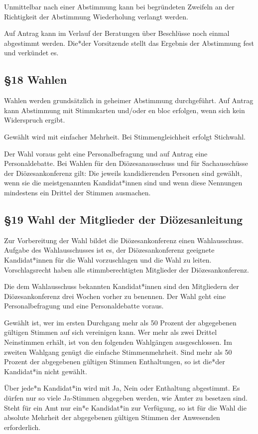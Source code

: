 \documentclass[12pt]{report}
\begin{document}
\begin{justify}
Unmittelbar nach einer Abstimmung kann bei begründeten Zweifeln an der Richtigkeit der Abstimmung 
Wiederholung verlangt werden.

Auf Antrag kann im Verlauf der Beratungen über Beschlüsse noch einmal abgestimmt werden.
Die*der Vorsitzende stellt das Ergebnis der Abstimmung fest und verkündet es.

\subsection*{§18 Wahlen}
Wahlen werden grundsätzlich in geheimer Abstimmung durchgeführt. Auf Antrag kann Abstimmung mit
Stimmkarten und/oder en bloc erfolgen, wenn sich kein Widerspruch ergibt.

Gewählt wird mit einfacher Mehrheit. Bei Stimmengleichheit erfolgt Stichwahl.

Der Wahl voraus geht eine Personalbefragung und auf Antrag eine Personaldebatte. Bei Wahlen für den 
Diözesanausschuss und für Sachausschüsse der Diözesankonferenz gilt: Die jeweils kandidierenden Personen
sind gewählt, wenn sie die meistgenannten Kandidat*innen sind und wenn diese Nennungen mindestens ein
Drittel der Stimmen ausmachen.

\subsection*{§19 Wahl der Mitglieder der Diözesanleitung}
Zur Vorbereitung der Wahl bildet die Diözesankonferenz einen Wahlausschuss. Aufgabe des Wahlausschusses
ist es, der Diözesankonferenz geeignete Kandidat*innen für die Wahl vorzuschlagen und die Wahl zu leiten.
Vorschlagsrecht haben alle stimmberechtigten Mitglieder der Diözesankonferenz.

Die dem Wahlausschuss bekannten Kandidat*innen sind den Mitgliedern der Diözesankonferenz drei Wochen
vorher zu benennen. Der Wahl geht eine Personalbefragung und eine Personaldebatte voraus.

Gewählt ist, wer im ersten Durchgang mehr als 50 Prozent der abgegebenen gültigen Stimmen auf sich 
vereinigen kann. Wer mehr als zwei Drittel Neinstimmen erhält, ist von den folgenden Wahlgängen ausgeschlossen. 
Im zweiten Wahlgang genügt die einfache Stimmenmehrheit. Sind mehr als 50 Prozent der abgegebenen
gültigen Stimmen Enthaltungen, so ist die*der Kandidat*in nicht gewählt.

Über jede*n Kandidat*in wird mit Ja, Nein oder Enthaltung abgestimmt. Es dürfen nur so viele Ja-Stimmen
abgegeben werden, wie Ämter zu besetzen sind. Steht für ein Amt nur ein*e Kandidat*in zur Verfügung, so ist für
die Wahl die absolute Mehrheit der abgegebenen gültigen Stimmen der Anwesenden erforderlich.


\end{justify}
\end{document}
